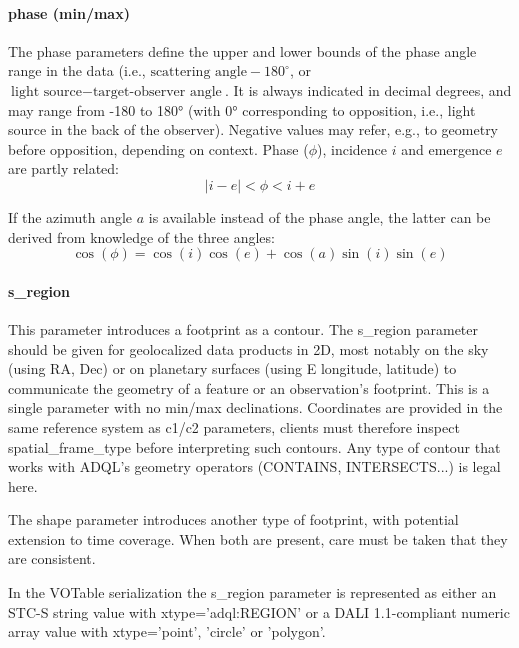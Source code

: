 \documentclass[11pt,a4paper]{ivoa}
\begin{document}
\paragraph{phase (min/max)}

The phase parameters define the upper and lower bounds of the phase
angle range in the data (i.e., $\textrm{scattering angle} - 180^\circ$, or 
$\textrm{light source}-\textrm{target-observer angle}$. 
It is always indicated in decimal degrees,
and may range from -180 to 180° (with 0° corresponding to opposition,
i.e., light source in the back of the observer). Negative values may
refer, e.g., to geometry before opposition, depending on context.
Phase ($\phi$), incidence $i$ and emergence $e$ are partly related:
\begin{displaymath}
  |i - e| < \phi < i + e
\end{displaymath}

If the azimuth angle $a$ is available instead of the phase angle,
the latter can be derived from knowledge of the three angles:
\begin{displaymath}
  \cos(\phi) = \cos(i) \cos(e) + \cos(a) \sin(i) \sin(e)
\end{displaymath}

\paragraph{s\_region}

This parameter introduces a footprint as a contour. The s\_region
parameter should be given for geolocalized data products in 2D, most
notably on the sky (using RA, Dec) or on planetary surfaces (using E
longitude, latitude) to communicate the geometry of a feature or an
observation's footprint. This is a single parameter with no min/max
declinations. Coordinates are provided in the same reference system as
c1/c2 parameters, clients must therefore inspect spatial\_frame\_type
before interpreting such contours. Any type of contour that works with
ADQL's geometry operators (CONTAINS, INTERSECTS...) is legal here.

The shape parameter introduces another type of footprint, with potential
extension to time coverage. When both are present, care must be taken
that they are consistent.

In the VOTable serialization the s\_region parameter is represented
as either an STC-S string value with xtype='adql:REGION' or a DALI
1.1-compliant numeric array value with xtype='point', 'circle' or
'polygon'.
\end{document}
